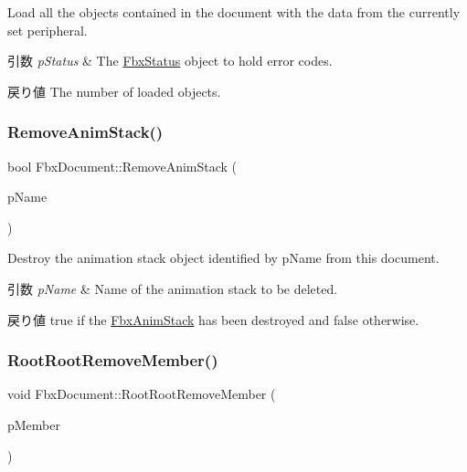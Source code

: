 Load all the objects contained in the document with the data from the currently set peripheral. 
\begin{DoxyParams}{引数}
{\em p\+Status} & The \hyperlink{class_fbx_status}{Fbx\+Status} object to hold error codes. \\
\hline
\end{DoxyParams}
\begin{DoxyReturn}{戻り値}
The number of loaded objects. 
\end{DoxyReturn}
\mbox{\label{class_fbx_document_a7f74b885faf1308f36a3923a0a27dc8b}} 
\subsubsection{\texorpdfstring{Remove\+Anim\+Stack()}{RemoveAnimStack()}}
{\footnotesize\ttfamily bool Fbx\+Document\+::\+Remove\+Anim\+Stack (\begin{DoxyParamCaption}\item[{const char $\ast$}]{p\+Name }\end{DoxyParamCaption})}

Destroy the animation stack object identified by p\+Name from this document. 
\begin{DoxyParams}{引数}
{\em p\+Name} & Name of the animation stack to be deleted. \\
\hline
\end{DoxyParams}
\begin{DoxyReturn}{戻り値}
{\ttfamily true} if the \hyperlink{class_fbx_anim_stack}{Fbx\+Anim\+Stack} has been destroyed and {\ttfamily false} otherwise. 
\end{DoxyReturn}
\mbox{\label{class_fbx_document_a7c1703bc0964a016615abf97baf0bc2c}} 
\subsubsection{\texorpdfstring{Root\+Root\+Remove\+Member()}{RootRootRemoveMember()}}
{\footnotesize\ttfamily void Fbx\+Document\+::\+Root\+Root\+Remove\+Member (\begin{DoxyParamCaption}\item[{\hyperlink{class_fbx_object}{Fbx\+Object} $\ast$}]{p\+Member }\end{DoxyParamCaption})\hspace{0.3cm}{\ttfamily [inline]}}

